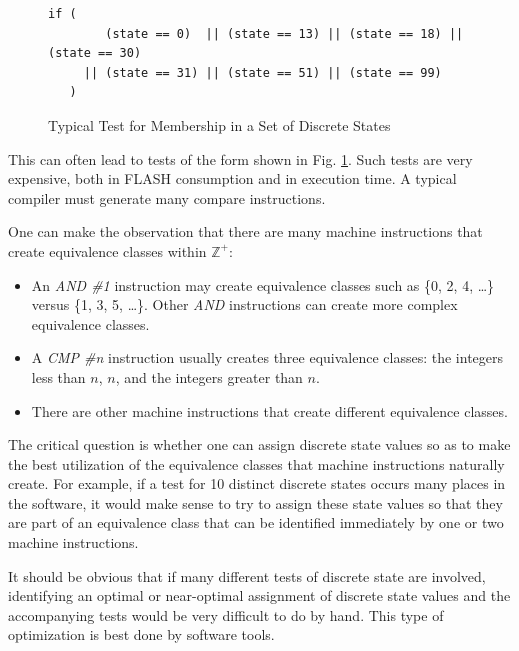 \documentclass[letterpaper,10pt,titlepage]{article}
\begin{document}
\begin{figure}
\begin{small}
\begin{verbatim}
if (
        (state == 0)  || (state == 13) || (state == 18) || (state == 30)
     || (state == 31) || (state == 51) || (state == 99)
   ) 
\end{verbatim}
\end{small}
\caption{Typical Test for Membership in a Set of Discrete States}
\label{fig:sfrr0:secd0:01}
\end{figure}

This can often lead to tests of the form shown in
Fig. \ref{fig:sfrr0:secd0:01}.
Such tests are very expensive, both in FLASH consumption and in execution time.
A typical compiler must generate many compare instructions.

One can make the observation that there are many machine instructions that
create equivalence classes within $\mathbb{Z}^+$:

\begin{itemize}
\item An \emph{AND \#1} instruction may create equivalence classes such as 
      \{0, 2, 4, \ldots{}\} versus \{1, 3, 5, \ldots{}\}.  Other \emph{AND} instructions
      can create more complex equivalence classes.
\item A \emph{CMP \#n} instruction usually creates three equivalence classes:  the integers less than $n$,
      $n$, and the integers greater than $n$.
\item There are other machine instructions that create different equivalence classes.
\end{itemize}

The critical question is whether one can assign discrete state values so as to
make the best utilization of the equivalence classes that machine instructions
naturally create.  For example, if a test for 10 distinct discrete states occurs
many places in the software, it would make sense to try to assign these
state values so that they are part of an equivalence class that can be
identified immediately by one or two machine instructions.

It should be obvious that if many different tests of discrete state are involved,
identifying an optimal or near-optimal assignment of discrete state values and
the accompanying tests would be very difficult to do by hand.  This type of
optimization is best done by software tools.


\end{document}
